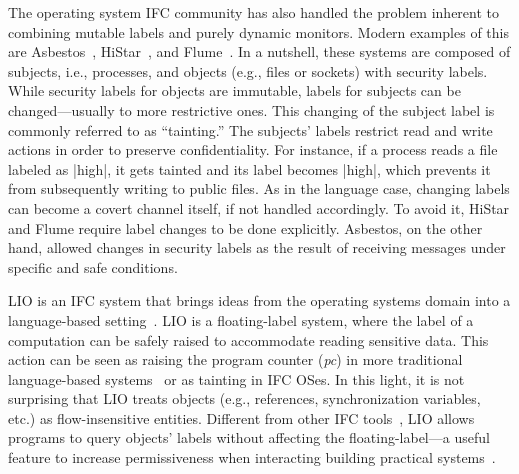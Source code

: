 The operating system IFC
community has also handled the problem inherent to combining mutable
labels and purely dynamic monitors. Modern examples of this are
Asbestos~\cite{Efstathopoulos:2005}, HiStar~\cite{zeldovich:histar},
and Flume~\cite{krohn:flume}. In a nutshell, these systems are composed of
subjects, i.e., processes, and objects (e.g., files or sockets) with security
labels. While security labels for objects are immutable, labels for subjects can
be changed---usually to more restrictive ones. This changing of the subject label 
is commonly referred to as ``tainting.''
%
The subjects' labels restrict read and write actions in order to
preserve confidentiality. For instance, if a process reads a file labeled as
|high|, it gets tainted and its label becomes |high|, which prevents it from subsequently
writing to public files. As in the language case, changing labels can become a covert
channel itself, if not handled accordingly. To avoid it, HiStar and Flume require label changes to be done
explicitly.  Asbestos, on the other hand, allowed changes in security labels as
the result of receiving messages under specific and safe conditions.


LIO is an IFC system that brings ideas from the operating systems domain into a language-based
setting~\cite{stefan:lio,stefan:addressing-covert}.  LIO is a floating-label
system, where the label of a computation can be safely raised to accommodate
reading sensitive data. This action can be seen as raising the program counter
(\emph{pc}) in more traditional language-based
systems~\cite{sabelfeld:language-based-iflow} or as tainting in IFC OSes.  In
this light, it is not surprising that LIO treats objects (e.g., references,
synchronization variables, etc.) as flow-insensitive entities. Different from
other IFC tools~\cite{jif,FlowCaml,Hedin13}, LIO allows programs to query
objects' labels without affecting the floating-label---a useful feature to
increase permissiveness when interacting building practical systems~\cite{giffin:hails}.


